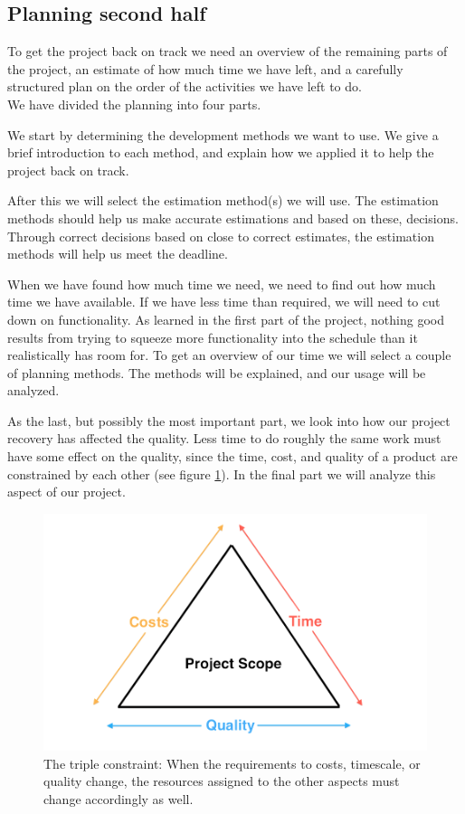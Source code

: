 \subsection{Planning second half}
To get the project back on track we need an overview of the remaining parts of the project, an estimate of how much time we have left, and a carefully structured plan on the order of the activities we have left to do.\\
We have divided the planning into four parts.

We start by determining the development methods we want to use. We give a brief introduction to each method, and explain how we applied it to help the project back on track.

After this we will select the estimation method(s) we will use. The estimation methods should help us make accurate estimations and based on these, decisions. Through correct decisions based on close to correct estimates, the estimation methods will help us meet the deadline.

When we have found how much time we need, we need to find out how much time we have available. If we have less time than required, we will need to cut down on functionality. As learned in the first part of the project, nothing good results from trying to squeeze more functionality into the schedule than it realistically has room for.
To get an overview of our time we will select a couple of planning methods. The methods will be explained, and our usage will be analyzed.

As the last, but possibly the most important part, we look into how our project recovery has affected the quality. Less time to do roughly the same work must have some effect on the quality, since the time, cost, and quality of a product are constrained by each other (see figure \ref{fig:timeCostsQuality})\cite[p. 191]{PM}. In the final part we will analyze this aspect of our project.

\begin{figure}[t]
  \includegraphics[width=\textwidth]{illustrations/timeCostsQuality}
  \caption{The triple constraint: When the requirements to costs, timescale, or quality change, the resources assigned to the other aspects must change accordingly as well.}
  \label{fig:timeCostsQuality}
\end{figure}
